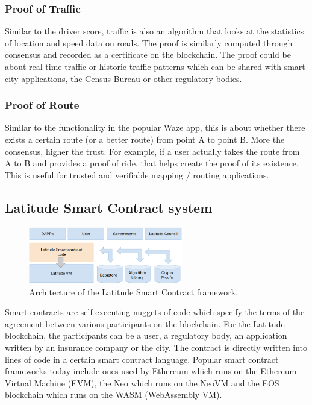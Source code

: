 \subsubsection{Proof of Traffic}

Similar to the driver score, traffic is also an algorithm that looks at the statistics
of location and speed data on roads. The proof is similarly computed through consensus and recorded as a certificate on
the blockchain. The proof could be about real-time traffic or historic traffic patterns which can be shared with smart
city applications, the Census Bureau or other regulatory bodies.

\subsubsection{Proof of Route}

Similar to the functionality in the popular Waze app, this is about whether there exists
a certain route (or a better route) from point A to point B. More the consensus, higher the trust. For example, if a
user actually takes the route from A to B and provides a proof of ride, that helps create the proof of its existence.
This is useful for trusted and verifiable mapping / routing applications.

\subsection{Latitude Smart Contract system}

\begin{figure}[t]
    \centering
    \includegraphics[width=0.60\textwidth]{lat_sc.png}
  \caption{Architecture of the Latitude Smart Contract framework.}
    \label{fig:lat-sc}
\end{figure}

Smart contracts are self-executing nuggets of code which specify the terms of the agreement between various participants
on the blockchain. For the Latitude blockchain, the participants can be a user, a regulatory body, an application
written by an insurance company or the city. The contract is directly written into lines of code in a certain smart
contract language. Popular smart contract frameworks today include ones used by Ethereum which runs on the Ethereum Virtual Machine (EVM),
the Neo which runs on the NeoVM and the EOS blockchain which runs on the WASM (WebAssembly VM).

